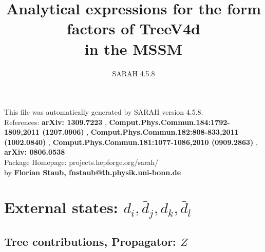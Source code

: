 \documentclass[A4,landscape]{article}
\begin{document}
\title{Analytical expressions for the form factors of TreeV4d\\ in the MSSM } 
 \author{SARAH 4.5.8} 
 \maketitle 
 \vspace{10cm} 
This file was automatically generated by SARAH version 4.5.8.  \\ 
References: {\bf arXiv: 1309.7223 }, {\bf Comput.Phys.Commun.184:1792-1809,2011 (1207.0906) }, {\bf Comput.Phys.Commun.182:808-833,2011 (1002.0840) }, {\bf Comput.Phys.Commun.181:1077-1086,2010 (0909.2863) }, {\bf arXiv: 0806.0538 } \\ 
Package Homepage: projects.hepforge.org/sarah/ \\ 
by {\bf Florian Staub, fnstaub@th.physik.uni-bonn.de} 
 \pagebreak 
 \tableofcontents 
 \pagebreak 
\section{External states: ${d_{{i}}, \bar{d}_{{j}}, d_{{k}}, \bar{d}_{{l}}}$} 
\subsection{Tree contributions, Propagator: $Z$} 
\end{document}
